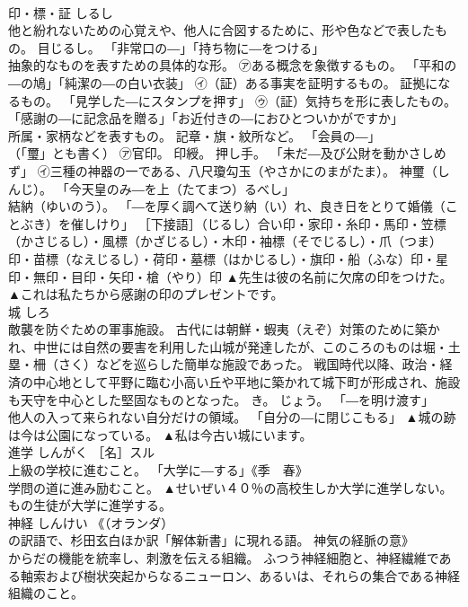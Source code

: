 \documentclass[8pt]{extreport}
\begin{document}
\begin{CJK}{UTF8}{min}
\\	印・標・証	しるし	
\\	他と紛れないための心覚えや、他人に合図するために、形や色などで表したもの。 目じるし。 「非常口の―」「持ち物に―をつける」 
\\	抽象的なものを表すための具体的な形。 ㋐ある概念を象徴するもの。 「平和の―の鳩」「純潔の―の白い衣装」 ㋑（証）ある事実を証明するもの。 証拠になるもの。 「見学した―にスタンプを押す」 ㋒（証）気持ちを形に表したもの。 「感謝の―に記念品を贈る」「お近付きの―におひとついかがですか」 
\\	所属・家柄などを表すもの。 記章・旗・紋所など。 「会員の―」 
\\	（「璽」とも書く） ㋐官印。 印綬。 押し手。 「未だ―及び公財を動かさしめず」 ㋑三種の神器の一である、八尺瓊勾玉（やさかにのまがたま）。 神璽（しんじ）。 「今天皇のみ―を上（たてまつ）るべし」 
\\	結納（ゆいのう）。 「―を厚く調へて送り納（い）れ、良き日をとりて婚儀（ことぶき）を催しけり」 ［下接語］（じるし）合い印・家印・糸印・馬印・笠標（かさじるし）・風標（かざじるし）・木印・袖標（そでじるし）・爪（つま）印・苗標（なえじるし）・荷印・墓標（はかじるし）・旗印・船（ふな）印・星印・無印・目印・矢印・槍（やり）印	▲先生は彼の名前に欠席の印をつけた。 ▲これは私たちから感謝の印のプレゼントです。
\\	城	しろ	
\\	敵襲を防ぐための軍事施設。 古代には朝鮮・蝦夷（えぞ）対策のために築かれ、中世には自然の要害を利用した山城が発達したが、このころのものは堀・土塁・柵（さく）などを巡らした簡単な施設であった。 戦国時代以降、政治・経済の中心地として平野に臨む小高い丘や平地に築かれて城下町が形成され、施設も天守を中心とした堅固なものとなった。 き。 じょう。 「―を明け渡す」 
\\	他人の入って来られない自分だけの領域。 「自分の―に閉じこもる」	▲城の跡は今は公園になっている。 ▲私は今古い城にいます。
\\	進学	しんがく	［名］スル 
\\	上級の学校に進むこと。 「大学に―する」《季　春》 
\\	学問の道に進み励むこと。	▲せいぜい４０％の高校生しか大学に進学しない。 
\\	もの生徒が大学に進学する。
\\	神経	しんけい	《（オランダ）
\\	の訳語で、杉田玄白ほか訳「解体新書」に現れる語。 神気の経脈の意》 
\\	からだの機能を統率し、刺激を伝える組織。 ふつう神経細胞と、神経繊維である軸索および樹状突起からなるニューロン、あるいは、それらの集合である神経組織のこと。 

\end{CJK}
\end{document}
